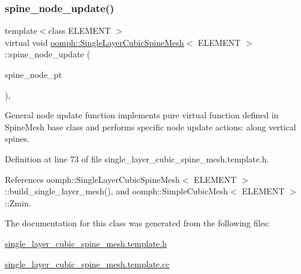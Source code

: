 \subsubsection{\texorpdfstring{spine\+\_\+node\+\_\+update()}{spine\_node\_update()}}
{\footnotesize\ttfamily template$<$class E\+L\+E\+M\+E\+NT $>$ \\
virtual void \hyperlink{classoomph_1_1SingleLayerCubicSpineMesh}{oomph\+::\+Single\+Layer\+Cubic\+Spine\+Mesh}$<$ E\+L\+E\+M\+E\+NT $>$\+::spine\+\_\+node\+\_\+update (\begin{DoxyParamCaption}\item[{Spine\+Node $\ast$}]{spine\+\_\+node\+\_\+pt }\end{DoxyParamCaption})\hspace{0.3cm}{\ttfamily [inline]}, {\ttfamily [virtual]}}



General node update function implements pure virtual function defined in Spine\+Mesh base class and performs specific node update actions\+: along vertical spines. 



Definition at line 73 of file single\+\_\+layer\+\_\+cubic\+\_\+spine\+\_\+mesh.\+template.\+h.



References oomph\+::\+Single\+Layer\+Cubic\+Spine\+Mesh$<$ E\+L\+E\+M\+E\+N\+T $>$\+::build\+\_\+single\+\_\+layer\+\_\+mesh(), and oomph\+::\+Simple\+Cubic\+Mesh$<$ E\+L\+E\+M\+E\+N\+T $>$\+::\+Zmin.



The documentation for this class was generated from the following files\+:\begin{DoxyCompactItemize}
\item 
\hyperlink{single__layer__cubic__spine__mesh_8template_8h}{single\+\_\+layer\+\_\+cubic\+\_\+spine\+\_\+mesh.\+template.\+h}\item 
\hyperlink{single__layer__cubic__spine__mesh_8template_8cc}{single\+\_\+layer\+\_\+cubic\+\_\+spine\+\_\+mesh.\+template.\+cc}\end{DoxyCompactItemize}
